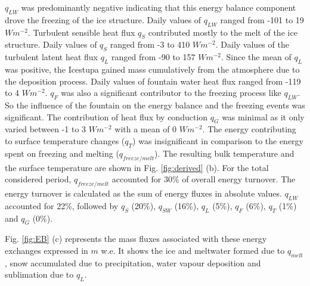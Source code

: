 \documentclass[utf8]{frontiersSCNS} %
\begin{document}
$q_{LW}$ was predominantly negative indicating that this energy balance component drove the freezing of the ice
structure. Daily values of $q_{LW}$ ranged from -101 to 19 $Wm^{-2}$.  Turbulent sensible heat flux $q_{S}$ contributed
mostly to the melt of the ice structure. Daily values of $q_{S}$ ranged from -3 to 410 $Wm^{-2}$.  Daily values of the
turbulent latent heat flux $q_{L}$ ranged from -90 to 157 $Wm^{-2}$.  Since the mean of $q_{L}$ was positive, the
Icestupa gained mass cumulatively from the atmosphere due to the deposition process.  Daily values of fountain water
heat flux  ranged from -119 to 4 $Wm^{-2}$. $q_{F}$ was also a significant contributor to the freezing process like
$q_{LW}$. So the influence of the fountain on the energy balance and the freezing events was significant. The
contribution of heat flux by conduction $q_{G}$ was minimal as it only varied between -1 to 3 $Wm^{-2}$ with a
mean of 0 $Wm^{-2}$. The energy contributing to surface temperature changes ($q_{T}$) was insignificant in comparison to
the energy spent on freezing and melting ($q_{freeze/melt}$). The resulting bulk temperature and the surface temperature
are shown in Fig. \ref{fig:derived} (b).  For the total considered period, $q_{freeze/melt}$  accounted
for 30\% of overall energy turnover. The energy turnover is calculated as the sum of energy fluxes in absolute values.
$q_{LW}$ accounted for 22\%, followed by $q_{S}$ (20\%), $q_{SW}$ (16\%), $q_{L}$ (5\%), $q_{F}$ (6\%), $q_{T}$ (1\%)
and $q_{G}$ (0\%).

Fig. \ref{fig:EB} (c) represents the mass fluxes associated with these energy exchanges expressed in $m$ w.e. It shows
the ice and meltwater formed due to $q_{melt}$, snow accumulated due to precipitation, water vapour deposition and
sublimation due to $q_L$. 

\end{document}
